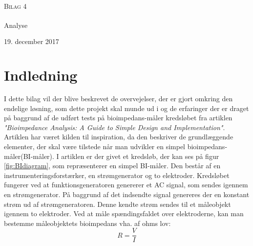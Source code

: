 



\begin{titlingpage}
\begin{center}

~ \\[3cm]


\textsc{\LARGE Bilag 4}\\[1.5cm]


\noindent\makebox[\linewidth]{\rule{\textwidth}{0.4pt}}\\
[0.5cm]{\Huge Analyse}
\noindent\makebox[\linewidth]{\rule{\textwidth}{0.4pt}}
\end{center}
\vfill
\begin{center}
{\large 19. december 2017}
\end{center}
\end{titlingpage}



\newpage
\tableofcontents*
\newpage


\chapter{Indledning}

I dette bilag vil der blive beskrevet de overvejelser, der er gjort omkring den endelige løsning, som dette projekt skal munde ud i og de erfaringer der er draget på baggrund af de udført tests på bioimpedans-måler kredsløbet fra artiklen \textit{"Bioimpedance Analysis: A Guide to Simple Design and Implementation"}. Artiklen har været kilden til inspiration, da den beskriver de grundlæggende elementer, der skal være tilstede når man udvikler en simpel bioimpedans-måler(BI-måler). I artiklen er der givet et kredsløb, der kan ses på figur \ref{fig:BIdiagram}, som repræsenterer en simpel BI-måler. Den består af en instrumenteringsforstærker, en strømgenerator og to elektroder. Kredsløbet fungerer ved at funktionsgeneratoren genererer et AC signal, som sendes igennem en strømgenerator. På baggrund af det indsendte signal genereres der en konstant strøm ud af strømgeneratoren. Denne kendte strøm sendes til et måleobjekt igennem to elektroder. Ved at måle spændingsfaldet over elektroderne, kan man bestemme måleobjektets bioimpedans vha. af ohms lov: $$R=\frac{V}{I}$$

